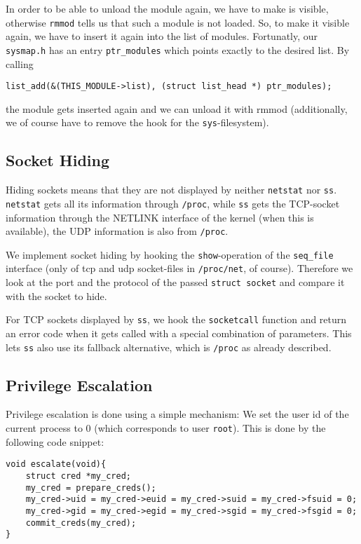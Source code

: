 \documentclass[10pt, letterpaper]{scrartcl}
\begin{document}
In order to be able to unload the module again, we have to make is visible, otherwise \texttt{rmmod} tells us that such a module is not loaded. So, to make it visible again, we have to insert it again into the list of modules. Fortunatly, our \texttt{sysmap.h} has an entry \texttt{ptr\_modules} which points exactly to the desired list. By calling 
\begin{verbatim}
list_add(&(THIS_MODULE->list), (struct list_head *) ptr_modules);
\end{verbatim}
the module gets inserted again and we can unload it with rmmod (additionally, we of course have to remove the hook for the \texttt{sys}-filesystem). 


\subsection{Socket Hiding}

Hiding sockets means that they are not displayed by neither \texttt{netstat} nor \texttt{ss}. \texttt{netstat} gets all its information through \texttt{/proc}, while \texttt{ss} gets the TCP-socket information through the NETLINK interface of the kernel (when this is available), the UDP information is also from \texttt{/proc}.

We implement socket hiding by hooking the \texttt{show}-operation of the \texttt{seq\_file} interface (only of tcp and udp socket-files in \texttt{/proc/net}, of course). Therefore we look at the port and the protocol of the passed \texttt{struct socket} and compare it with the socket to hide.

For TCP sockets displayed by \texttt{ss}, we hook the \texttt{socketcall} function and return an error code when it gets called with a special combination of parameters. This lets \texttt{ss} also use its fallback alternative, which is \texttt{/proc} as already described.

\subsection{Privilege Escalation}

Privilege escalation is done using a simple mechanism: We set the user id of the current process to 0 (which corresponds to user \texttt{root}). This is done by the following code snippet:

\begin{verbatim}
void escalate(void){
    struct cred *my_cred;
    my_cred = prepare_creds(); 
    my_cred->uid = my_cred->euid = my_cred->suid = my_cred->fsuid = 0;
    my_cred->gid = my_cred->egid = my_cred->sgid = my_cred->fsgid = 0;
    commit_creds(my_cred);
}
\end{verbatim}
\end{document}
